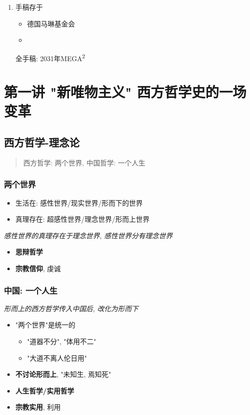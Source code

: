 \documentclass[11pt]{article}
\begin{document}
\begin{enumerate}
\item 手稿存于
\label{sec:org052d874}
\begin{itemize}
\item 德国马琳基金会
\item 
\end{itemize}
全手稿: 2031年MEGA\textsuperscript{2}
\end{enumerate}
\section{第一讲 "新唯物主义" 西方哲学史的一场变革}
\label{sec:org674f061}
\subsection{西方哲学-理念论}
\label{sec:orga035737}

\begin{quote}
西方哲学: 两个世界, 中国哲学: 一个人生
\end{quote}

\subsubsection{两个世界}
\label{sec:orgcd74811}
\begin{itemize}
\item 生活在: 感性世界/现实世界/形而下的世界
\item 真理存在: 超感性世界/理念世界/形而上世界
\end{itemize}
\emph{感性世界的真理存在于理念世界, 感性世界分有理念世界}
\begin{itemize}
\item \textbf{思辩哲学}
\item \textbf{宗教信仰}, 虔诚
\end{itemize}

\subsubsection{中国: 一个人生}
\label{sec:org96775e5}
\emph{形而上的西方哲学传入中国后, 改化为形而下}
\begin{itemize}
\item "两个世界"是统一的
\begin{itemize}
\item "道器不分", "体用不二"
\item "大道不离人伦日用"
\end{itemize}
\item \textbf{不讨论形而上}, "未知生, 焉知死"
\item \textbf{人生哲学/实用哲学}
\item \textbf{宗教实用}, 利用
\end{itemize}
\end{document}
